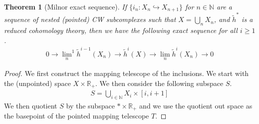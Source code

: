 \documentclass[12pt, notitlepage]{article}
\newtheorem{thm}{Theorem}[section]
\theoremstyle{definition}
\newcommand{\redco}{\widetilde{h}}
\begin{document}
\begin{thm}[Milnor exact sequence] \label{thm-milnor} If $\{ i_n : X_n \hookrightarrow X_{n+1} \}$
  for $n \in \mathbb{N}$ are a sequence of nested (pointed) CW subcomplexes such that
  $X = \bigcup_n X_n$, and $\redco^{\ast}$ is a reduced cohomology theory, then we have the
  following exact sequence for all $i \geq 1$.
  \begin{align*}
    0 \rightarrow {\lim_{n}}^1 \redco^{i-1}(X_n) \rightarrow \redco^i(X) \rightarrow \lim_n \redco^i(X_n) \rightarrow 0
  \end{align*}
\end{thm}

\begin{proof}
  We first construct the mapping telescope of the inclusions. We start with the (unpointed) space
  $X \times \mathbb{R}_+$.  We then consider the following subspace $S$.
  \begin{align*}
    S = \bigcup_{i \in \mathbb{N}} X_i \times [i,i+1]
  \end{align*}
  We then quotient $S$ by the subspace ${\ast} \times \mathbb{R}_+$ and we use the quotient out
  space as the basepoint of the pointed mapping telescope $T$.


\end{proof}
\end{document}
